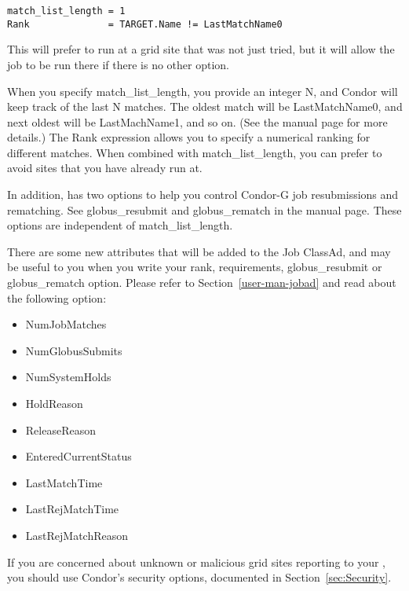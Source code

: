 \begin{verbatim}
match_list_length = 1
Rank              = TARGET.Name != LastMatchName0
\end{verbatim}

This will prefer to run at a grid site that was not just tried, but it
will allow the job to be run there if there is no other option. 

When you specify match\_list\_length, you provide an integer N, and
Condor will keep track of the last N matches. The oldest match will be
LastMatchName0, and next oldest will be LastMachName1, and so on. (See
the  manual page for more details.) The Rank expression
allows you to specify a numerical ranking for different matches. When
combined with match\_list\_length, you can prefer to avoid sites that
you have already run at. 

In addition,  has two options to help you control
Condor-G job resubmissions and rematching.  See globus\_resubmit and
globus\_rematch in the  manual page. These options are
independent of match\_list\_length.

There are some new attributes that will be added to the Job ClassAd,
and may be useful to you when you write your rank, requirements,
globus\_resubmit or globus\_rematch option. Please refer to
Section~\ref{user-man-jobad} and read about the following option:

\begin{itemize}
\item NumJobMatches
\item NumGlobusSubmits
\item NumSystemHolds
\item HoldReason
\item ReleaseReason
\item EnteredCurrentStatus
\item LastMatchTime
\item LastRejMatchTime
\item LastRejMatchReason
\end{itemize}

If you are concerned about unknown or malicious grid sites reporting
to your , you should use Condor's security options,
documented in Section~\ref{sec:Security}.
